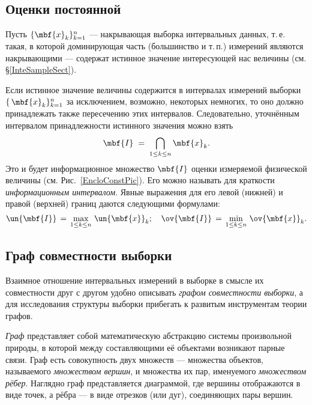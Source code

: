 \documentclass[a5paper,openany]{book}
\begin{document}
\subsection{Оценки постоянной} 
\label{EstConst}

Пусть $\{\mbf{x}_{k}\}_{k=1}^{n}$ --- накрывающая выборка интервальных данных, 
т.\,е. такая, в которой доминирующая часть (большинство и т.\,п.) измерений 
являются накрывающими --- содержат истинное значение интересующей нас величины 
(см. \S\ref{InteSampleSect}). 

Если истинное значение величины содержится в интервалах измерений выборки  $\{\,\mbf{x}_{k}\}_{k=1}^n$ за исключением, возможно, некоторых немногих, то оно 
должно принадлежать также пересечению этих интервалов. Следовательно, уточнённым 
интервалом принадлежности истинного значения можно взять 
\begin{equation} 
\label{IXInterval} 
\mbf{I}\; = \;\bigcap_{1\leq k\leq n} \mbf{x}_{k}. 
\end{equation} 
Это и будет информационное множество $\mbf{I}$ оценки измеряемой физичес\-кой величины 
(см. Рис.~\ref{EncloConstPic}). Его можно называть для краткости \emph{информационным 
интервалом}. Явные выражения для его левой (нижней) и правой (верхней) границ даются 
следующими формулами:                            
\begin{equation}
\label{LoUpBounds} 
\un{\mbf{I}}\, = \,\max_{1\leq k\leq n} \,\un{\mbf{x}}_{k};
\quad
\ov{\mbf{I}}\, = \,\min_{1\leq k\leq n} \,\ov{\mbf{x}}_{k}. 
\end{equation}           

\subsection{Граф совместности выборки} 
\label{CompatibilityGraph} 

Взаимное отношение интервальных измерений в выборке в смысле их совместности друг 
с другом удобно описывать \emph{графом совместности выборки},  а для исследования структуры выборки прибегать к развитым инструментам теории 
графов. 

\emph{Граф} представляет собой математическую абстракцию системы 
произвольной природы, в которой между составляющими её объектами возникают парные 
связи. Граф есть совокупность двух множеств --- множества объектов, называемого 
\emph{множеством вершин}, и множества их пар, именуемого \emph{множеством рёбер}. 
Наглядно граф представляется диаграммой, где вершины отображаются в виде точек, 
а рёбра --- в виде отрезков (или дуг), соединяющих пары вершин. 
\end{document}
